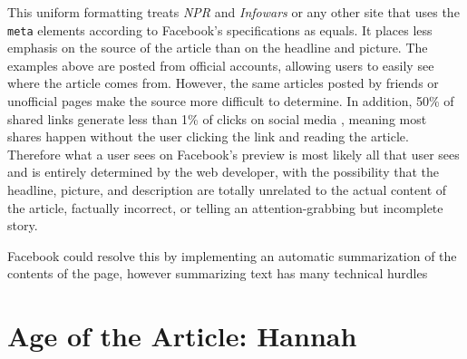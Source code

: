 \documentclass[12pt]{article}
\begin{document}
This uniform formatting treats {\it NPR} and {\it Infowars} or any other site that uses the \texttt{meta} elements according to Facebook's specifications as equals. It places less emphasis on the source of the article than on the headline and picture. The examples above are posted from official accounts, allowing users to easily see where the article comes from. However, the same articles posted by friends or unofficial pages make the source more difficult to determine. In addition, 50\% of shared links generate less than 1\% of clicks on social media \citep{clicks_vs_shares}, meaning most shares happen without the user clicking the link and reading the article. Therefore what a user sees on Facebook's preview is most likely all that user sees and is entirely determined by the web developer, with the possibility that the headline, picture, and description are totally unrelated to the actual content of the article, factually incorrect, or telling an attention-grabbing but incomplete story.

Facebook could resolve this by implementing an automatic summarization of the contents of the page, however summarizing text has many technical hurdles

\section{Age of the Article: Hannah}
\end{document}
